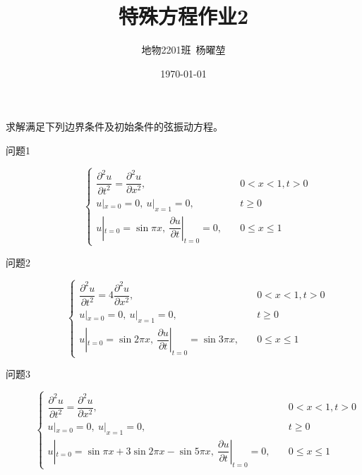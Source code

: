 \documentclass[12pt]{ctexart}
\title{特殊方程作业2}
\author{地物2201班\ 杨曜堃}
\date{\today}
\begin{document}
    \markboth{\theauthor}{\thetitle}
    \maketitle
    求解满足下列边界条件及初始条件的弦振动方程。
    \begin{description}
        \item[问题1]$$\begin{cases}
            \dfrac{\partial^2u}{\partial t^2}=\dfrac{\partial^2u}{\partial x^2},&\quad 0<x<1,t>0\\
            u|_{x=0}=0,\ u|_{x=1}=0,&\quad t\geqslant 0\\
            u|_{t=0}=\sin \pi x,\ \dfrac{\partial u}{\partial t}|_{t=0}=0,&\quad 0\leqslant x\leqslant 1
        \end{cases}$$
        \item[问题2]$$\begin{cases}
            \dfrac{\partial^2u}{\partial t^2}=4\dfrac{\partial^2u}{\partial x^2},&\quad 0<x<1,t>0\\
            u|_{x=0}=0,\ u|_{x=1}=0,&\quad t\geqslant 0\\
            u|_{t=0}=\sin 2\pi x,\ \dfrac{\partial u}{\partial t}|_{t=0}=\sin 3\pi x,&\quad 0\leqslant x\leqslant 1
        \end{cases}$$
        \item[问题3]$$\begin{cases}
            \dfrac{\partial^2u}{\partial t^2}=\dfrac{\partial^2u}{\partial x^2},&\quad 0<x<1,t>0\\
            u|_{x=0}=0,\ u|_{x=1}=0,&\quad t\geqslant 0\\
            u|_{t=0}=\sin \pi x +3\sin 2\pi x-\sin 5\pi x,\ \dfrac{\partial u}{\partial t}|_{t=0}=0,&\quad 0\leqslant x\leqslant 1
        \end{cases}$$
    \end{description}
\end{document}
